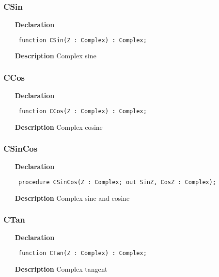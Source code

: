 \documentclass[12pt,a4paper,oneside]{report}
\newcommand{\declarationitem}[1]{\textbf{#1}}
\newcommand{\descriptiontitle}[1]{\textbf{#1}}
\newcommand{\code}[1]{\texttt{#1}}
\begin{document}
\subsubsection{CSin}
\label{ucomplex-CSin}
\begin{itemize}\item[\declarationitem{Declaration}\hfill]
\begin{flushleft}
\code{
function CSin(Z : Complex) : Complex;}

\end{flushleft}

\par
\item[\descriptiontitle{Description}]
Complex sine

\end{itemize}
\subsubsection{CCos}
\label{ucomplex-CCos}
\begin{itemize}\item[\declarationitem{Declaration}\hfill]
\begin{flushleft}
\code{
function CCos(Z : Complex) : Complex;}

\end{flushleft}

\par
\item[\descriptiontitle{Description}]
Complex cosine

\end{itemize}
\subsubsection{CSinCos}
\label{ucomplex-CSinCos}
\begin{itemize}\item[\declarationitem{Declaration}\hfill]
\begin{flushleft}
\code{
procedure CSinCos(Z : Complex; out SinZ, CosZ : Complex);}

\end{flushleft}

\par
\item[\descriptiontitle{Description}]
Complex sine and cosine

\end{itemize}
\subsubsection{CTan}
\label{ucomplex-CTan}
\begin{itemize}\item[\declarationitem{Declaration}\hfill]
\begin{flushleft}
\code{
function CTan(Z : Complex) : Complex;}

\end{flushleft}

\par
\item[\descriptiontitle{Description}]
Complex tangent

\end{itemize}
\end{document}

